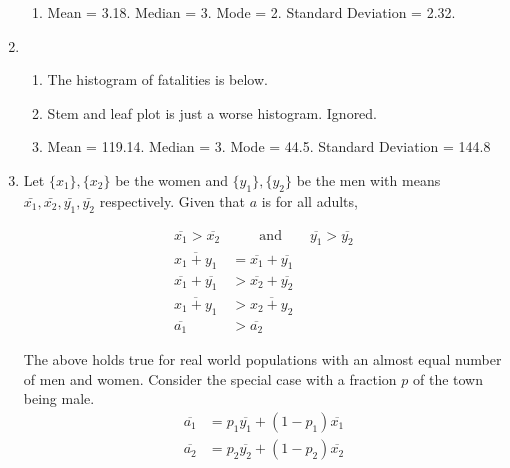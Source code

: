 \begin{enumerate}
\begin{enumerate}
		\item Mean = 3.18. Median = 3. Mode = 2. Standard Deviation = 2.32.
		
		
	\end{enumerate}
	
	\item \begin{enumerate}
		\item The histogram of fatalities is below.
		\begin{figure}[H]
			\centering
		\end{figure}
		
		\item Stem and leaf plot is just a worse histogram. Ignored.
		\item Mean = 119.14. Median = 3. Mode = 44.5. Standard Deviation = 144.8
	\end{enumerate}
	
	\item Let $ \{x_1\} , \{x_2\} $ be the women and $ \{y_1\} , \{y_2\} $ be the men with means $ \bar{x_1}, \bar{x_2}, \bar{y_1}, \bar{y_2} $ respectively. Given that $ a $ is for all adults,
	
		\begin{align}
			\overline{x_1} > \overline{x_2} &\qquad \text{and} \qquad \overline{y_1} > \overline{y_2} \\
			\overline{x_1 + y_1} &= \overline{x_1} + \overline{y_1} \\
			\overline{x_1} + \overline{y_1} &> \overline{x_2} + \overline{y_2} \\
			\overline{x_1 + y_1} &> \overline{x_2 + y_2} \\
			\overline{a_1} &> \overline{a_2}
		\end{align}
		
		The above holds true for real world populations with an almost equal number of men and women. Consider the special case with a fraction $ p $ of the town being male. 
		\begin{align}
			\overline{a_1} &= p_1 \overline{y_1} + (1 - p_1) \overline{x_1} \\
			\overline{a_2} &= p_2 \overline{y_2} + (1 - p_2) \overline{x_2} \\
		\end{align}
		

\end{enumerate}
